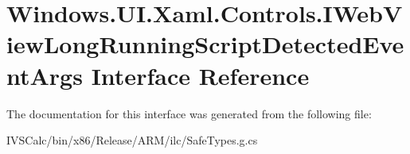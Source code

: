 \hypertarget{interface_windows_1_1_u_i_1_1_xaml_1_1_controls_1_1_i_web_view_long_running_script_detected_event_args}{}\section{Windows.\+U\+I.\+Xaml.\+Controls.\+I\+Web\+View\+Long\+Running\+Script\+Detected\+Event\+Args Interface Reference}
\label{interface_windows_1_1_u_i_1_1_xaml_1_1_controls_1_1_i_web_view_long_running_script_detected_event_args}


The documentation for this interface was generated from the following file\+:\begin{DoxyCompactItemize}
\item 
I\+V\+S\+Calc/bin/x86/\+Release/\+A\+R\+M/ilc/Safe\+Types.\+g.\+cs\end{DoxyCompactItemize}
